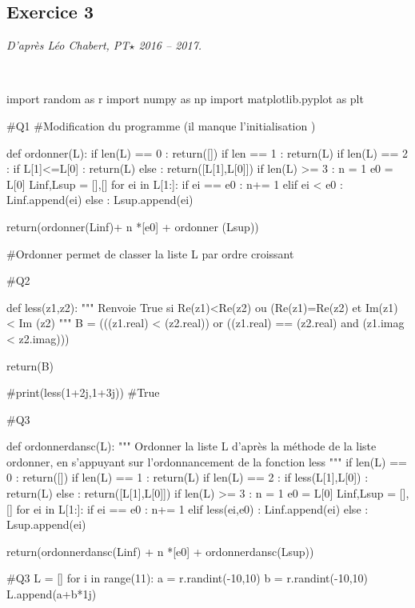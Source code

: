 \documentclass[10pt,fleqn]{article} %
\begin{document}
\subsection*{Exercice 3}
\textit{D'après Léo Chabert, PT$\star$ 2016 -- 2017.}
\begin{corrige}
$\quad$
\begin{python}
import random as r
import numpy as np
import matplotlib.pyplot as plt

#Q1
 #Modification du programme (il manque l'initialisation )

def ordonner(L):
    if len(L) == 0 :
        return([])
    if len == 1 :
        return(L)
    if len(L) == 2 :
        if L[1]<=L[0] :
            return(L)
        else :
            return([L[1],L[0]])
    if len(L) >= 3 :
        n = 1
        e0 = L[0]
        Linf,Lsup = [],[]
        for ei in L[1:]:
          if ei == e0 :
              n+= 1
          elif ei < e0  :
              Linf.append(ei)
          else :
              Lsup.append(ei)

        return(ordonner(Linf)+ n *[e0] + ordonner (Lsup))

#Ordonner permet de classer la liste L par ordre croissant

#Q2

def less(z1,z2):
    """ Renvoie True si Re(z1)<Re(z2) ou (Re(z1)=Re(z2) et Im(z1) < Im (z2) """
    B = (((z1.real) < (z2.real)) or ((z1.real) == (z2.real) and (z1.imag < z2.imag)))

    return(B)

#print(less(1+2j,1+3j))
#True

#Q3

def ordonnerdansc(L):
    """ Ordonner la liste L d'après la méthode de la liste ordonner, 
    en s'appuyant sur l'ordonnancement de la fonction less """
    if len(L) == 0 :
        return([])
    if len(L) == 1 :
        return(L)
    if len(L) == 2 :
         if less(L[1],L[0]) :
             return(L)
         else :
             return([L[1],L[0]])
    if len(L) >= 3 :
        n = 1
        e0 = L[0]
        Linf,Lsup = [],[]
        for ei in L[1:]:
             if ei == e0 :
                 n+= 1
             elif less(ei,e0) :
                 Linf.append(ei)
             else :
                 Lsup.append(ei)
        
        return(ordonnerdansc(Linf) + n *[e0] + ordonnerdansc(Lsup))
    
#Q3
L = []
for i in range(11):
    a = r.randint(-10,10)
    b = r.randint(-10,10)
    L.append(a+b*1j)



\end{python}
\end{corrige}
\end{document}
